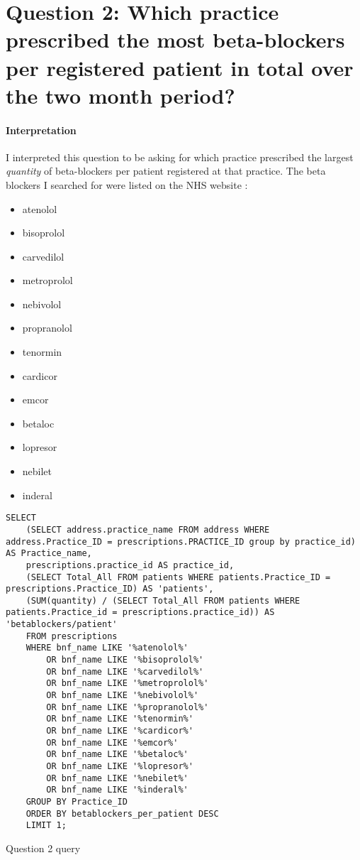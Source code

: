 \documentclass{report}
\begin{document}
\section{Question 2: Which practice prescribed the most beta-blockers per registered patient in total over the two month period?}

\paragraph{Interpretation}
I interpreted this question to be asking for which practice prescribed the largest \textit{quantity} of beta-blockers per patient registered at that practice. The beta blockers I searched for were listed on the NHS website \cite{nhsbetablockers}:
\begin{itemize}
\item atenolol
\item bisoprolol
\item carvedilol
\item metroprolol
\item nebivolol
\item propranolol
\item tenormin
\item cardicor
\item emcor
\item betaloc
\item lopresor
\item nebilet
\item inderal
\end{itemize}

\begin{listing}[H]
\begin{verbatim}
SELECT 
    (SELECT address.practice_name FROM address WHERE address.Practice_ID = prescriptions.PRACTICE_ID group by practice_id) AS Practice_name, 
    prescriptions.practice_id AS practice_id,
	(SELECT Total_All FROM patients WHERE patients.Practice_ID = prescriptions.Practice_ID) AS 'patients',
    (SUM(quantity) / (SELECT Total_All FROM patients WHERE patients.Practice_id = prescriptions.practice_id)) AS 'betablockers/patient' 
    FROM prescriptions 
    WHERE bnf_name LIKE '%atenolol%' 
        OR bnf_name LIKE '%bisoprolol%' 
        OR bnf_name LIKE '%carvedilol%' 
        OR bnf_name LIKE '%metroprolol%' 
        OR bnf_name LIKE '%nebivolol%' 
        OR bnf_name LIKE '%propranolol%' 
        OR bnf_name LIKE '%tenormin%' 
        OR bnf_name LIKE '%cardicor%' 
        OR bnf_name LIKE '%emcor%' 
        OR bnf_name LIKE '%betaloc%' 
        OR bnf_name LIKE '%lopresor%' 
        OR bnf_name LIKE '%nebilet%' 
        OR bnf_name LIKE '%inderal%' 
    GROUP BY Practice_ID 
    ORDER BY betablockers_per_patient DESC 
    LIMIT 1;
\end{verbatim}
\caption{Question 2 query}
\label{lst: Q2-1}
\end{listing}
\end{document}
